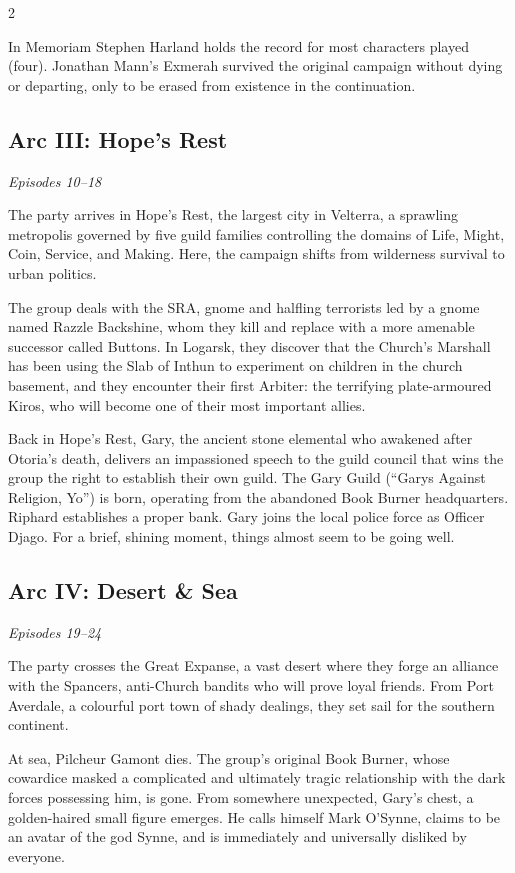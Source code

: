 \begin{multicols}{2}
\begin{DndSidebar}{In Memoriam}
Stephen Harland holds the record for most characters played (four).  Jonathan Mann's Exmerah survived the original campaign without dying or departing, only to be erased from existence in the continuation.
\end{DndSidebar}

\subsection*{Arc III: Hope's Rest}
\textit{Episodes 10--18}

\medskip

\noindent
The party arrives in Hope's Rest, the largest city in Velterra, a sprawling metropolis governed by five guild families controlling the domains of Life, Might, Coin, Service, and Making.  Here, the campaign shifts from wilderness survival to urban politics.

The group deals with the SRA, gnome and halfling terrorists led by a gnome named Razzle Backshine, whom they kill and replace with a more amenable successor called Buttons.  In Logarsk, they discover that the Church's Marshall has been using the Slab of Inthun to experiment on children in the church basement, and they encounter their first Arbiter: the terrifying plate-armoured Kiros, who will become one of their most important allies.

Back in Hope's Rest, Gary, the ancient stone elemental who awakened after Otoria's death, delivers an impassioned speech to the guild council that wins the group the right to establish their own guild.  The Gary Guild (``Garys Against Religion, Yo'') is born, operating from the abandoned Book Burner headquarters.  Riphard establishes a proper bank.  Gary joins the local police force as Officer Djago.  For a brief, shining moment, things almost seem to be going well.

\subsection*{Arc IV: Desert \& Sea}
\textit{Episodes 19--24}

\medskip

\noindent
The party crosses the Great Expanse, a vast desert where they forge an alliance with the Spancers, anti-Church bandits who will prove loyal friends.  From Port Averdale, a colourful port town of shady dealings, they set sail for the southern continent.

At sea, Pilcheur Gamont dies.  The group's original Book Burner, whose cowardice masked a complicated and ultimately tragic relationship with the dark forces possessing him, is gone.  From somewhere unexpected, Gary's chest, a golden-haired small figure emerges.  He calls himself Mark O'Synne, claims to be an avatar of the god Synne, and is immediately and universally disliked by everyone.


\end{multicols}
